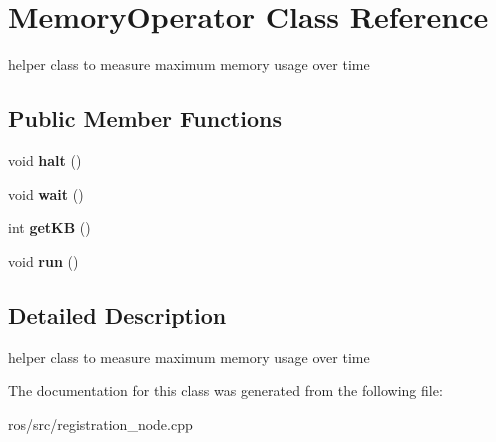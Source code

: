 \hypertarget{classMemoryOperator}{
\section{MemoryOperator Class Reference}
\label{classMemoryOperator}
}


helper class to measure maximum memory usage over time  


\subsection*{Public Member Functions}
\begin{DoxyCompactItemize}
\item 
\hypertarget{classMemoryOperator_a4d20406dc31820a062f4aa115ee45aab}{
void {\bfseries halt} ()}
\label{classMemoryOperator_a4d20406dc31820a062f4aa115ee45aab}

\item 
\hypertarget{classMemoryOperator_a2b4fc80829c8af9cb8a1a2db6b14d8b0}{
void {\bfseries wait} ()}
\label{classMemoryOperator_a2b4fc80829c8af9cb8a1a2db6b14d8b0}

\item 
\hypertarget{classMemoryOperator_a0aed915fdd9227d3ef781cf09a3d22cb}{
int {\bfseries getKB} ()}
\label{classMemoryOperator_a0aed915fdd9227d3ef781cf09a3d22cb}

\item 
\hypertarget{classMemoryOperator_ac955cd45d69c6ab2102d22d347e80c63}{
void {\bfseries run} ()}
\label{classMemoryOperator_ac955cd45d69c6ab2102d22d347e80c63}

\end{DoxyCompactItemize}


\subsection{Detailed Description}
helper class to measure maximum memory usage over time 

The documentation for this class was generated from the following file:\begin{DoxyCompactItemize}
\item 
ros/src/registration\_\-node.cpp\end{DoxyCompactItemize}
